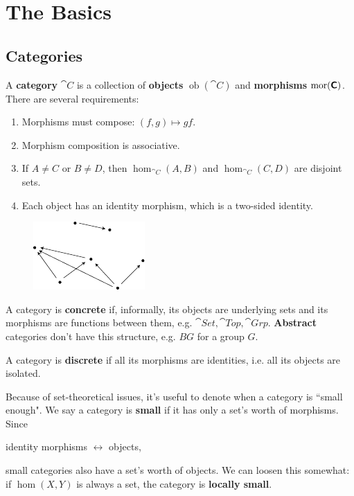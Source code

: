 \documentclass[twoside,10pt]{report}
\DeclareMathOperator{\ob}{ob}
\begin{document}
\tableofcontents


\chapter{The Basics}


\section{Categories}


\begin{defn}
	A \textbf{category} $\cat{C}$ is a collection of \textbf{objects} $\ob(\cat{C})$ and \textbf{morphisms} $\operatorname{mor}({\text{\sffamily\textbf{C}} })$. There are several requirements:
	\begin{enumerate}
		\item Morphisms must compose: $(f, g) \mapsto gf.$
		\item Morphism composition is associative.
		\item If $A \neq C$ or $B \neq D$, then $\hom_{\cat{C}}(A,B)$ and $\hom_{\cat{C}}(C,D)$ are disjoint sets.
		\item Each object has an identity morphism, which is a two-sided identity.
	\end{enumerate}
\end{defn}
\begin{figure}[H]
	\centering
	\includegraphics[scale=1.4]{fig/category.pdf}
\end{figure}

A category is \textbf{concrete} if, informally, its objects are underlying sets and its morphisms are functions between them, e.g. $\cat{Set} , \cat{Top} , \cat{Grp} $. \textbf{Abstract} categories don't have this structure, e.g. $BG$ for a group $G$.

A category is \textbf{discrete} if all its morphisms are identities, i.e. all its objects are isolated.

Because of set-theoretical issues, it's useful to denote when a category is ``small enough". We say a category is \textbf{small} if it has only a set's worth of morphisms. Since
\begin{center}
	identity morphisms $\leftrightarrow $ objects,
\end{center}
small categories also have a set's worth of objects. We can loosen this somewhat: if $\hom(X,Y)$ is always a set, the category is \textbf{locally small}.
\end{document}
